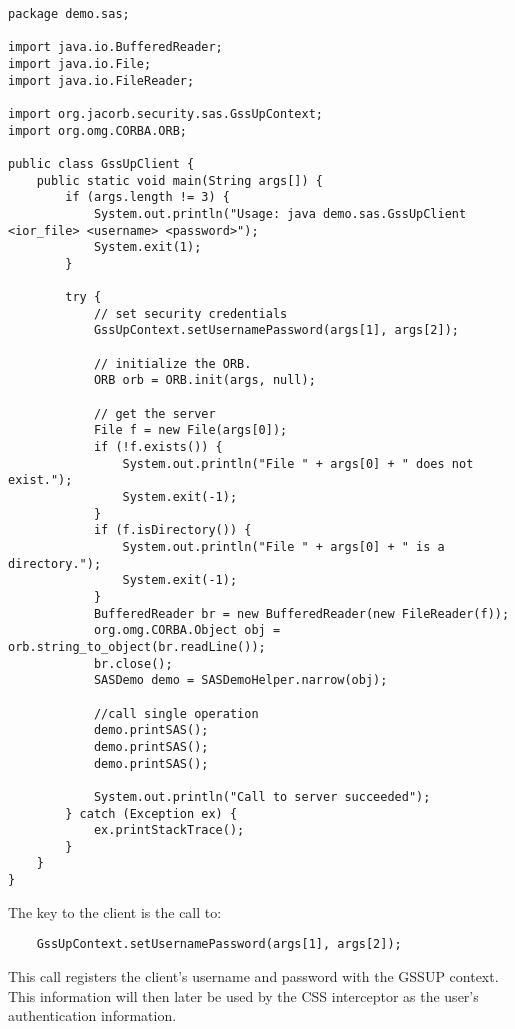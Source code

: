 \begin{scriptsize}
\begin{verbatim}
package demo.sas;

import java.io.BufferedReader;
import java.io.File;
import java.io.FileReader;

import org.jacorb.security.sas.GssUpContext;
import org.omg.CORBA.ORB;

public class GssUpClient {
    public static void main(String args[]) {
        if (args.length != 3) {
            System.out.println("Usage: java demo.sas.GssUpClient <ior_file> <username> <password>");
            System.exit(1);
        }

        try {
            // set security credentials
            GssUpContext.setUsernamePassword(args[1], args[2]);

            // initialize the ORB.
            ORB orb = ORB.init(args, null);

            // get the server
            File f = new File(args[0]);
            if (!f.exists()) {
                System.out.println("File " + args[0] + " does not exist.");
                System.exit(-1);
            }
            if (f.isDirectory()) {
                System.out.println("File " + args[0] + " is a directory.");
                System.exit(-1);
            }
            BufferedReader br = new BufferedReader(new FileReader(f));
            org.omg.CORBA.Object obj = orb.string_to_object(br.readLine());
            br.close();
            SASDemo demo = SASDemoHelper.narrow(obj);

            //call single operation
            demo.printSAS();
            demo.printSAS();
            demo.printSAS();

            System.out.println("Call to server succeeded");
        } catch (Exception ex) {
            ex.printStackTrace();
        }
    }
}
\end{verbatim}
\end{scriptsize}

The key to the client is the call to:
\begin{scriptsize}
\begin{verbatim}
    GssUpContext.setUsernamePassword(args[1], args[2]);
\end{verbatim}
\end{scriptsize}
This call registers the client's username and password with the GSSUP context.
This information will then later be used by the CSS interceptor as the user's
authentication information.

